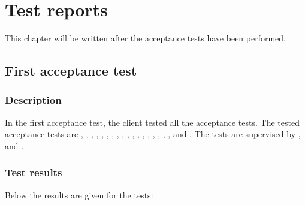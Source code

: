 \chapter{Test reports}
\label{chap:testReports}
This chapter will be written after the acceptance tests have been performed.

\section{First acceptance test}
\subsection{Description}

In the first acceptance test, the client tested all the acceptance tests. The  tested acceptance tests are , , , , , , , , , , , , , , , , , ,  and . The tests are supervised by \lasse{}, \roel{} and \thom{}.

\subsection{Test results}

Below the results are given for the tests:

